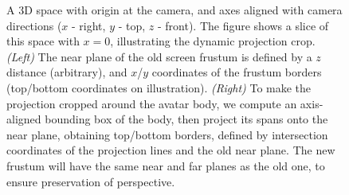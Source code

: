 \begin{figure}[htb]
	\centering
	\caption{A 3D space with origin at the camera, and axes aligned with camera directions ($x$ - right, $y$ - top, $z$ - front). The figure shows a slice of this space with $x=0$, illustrating the dynamic projection crop. \textit{(Left)} The near plane of the old screen frustum is defined by a $z$ distance (arbitrary), and $x$/$y$ coordinates of the frustum borders (top/bottom coordinates on illustration). \textit{(Right)} To make the projection cropped around the avatar body, we compute an axis-aligned bounding box of the body, then project its spans onto the near plane, obtaining top/bottom borders, defined by intersection coordinates of the projection lines and the old near plane. The new frustum will have the same near and far planes as the old one, to ensure preservation of perspective.}
	\label{fig:dynamic_crop_math}
\end{figure}

